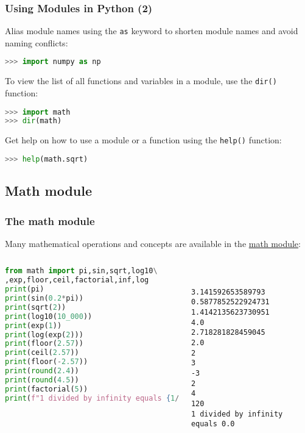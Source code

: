 \begin{frame}[fragile]
  \frametitle{Using Modules in Python (2)}
  Alias module names using the \lstinline{as} keyword to shorten module names and avoid naming conflicts:
  \begin{lstlisting}[language=Python, numbers=none]
>>> import numpy as np
  \end{lstlisting}\pause
  To view the list of all functions and variables in a module, use the \lstinline{dir()} function:
  \begin{lstlisting}[language=Python, numbers=none]
>>> import math
>>> dir(math)
  \end{lstlisting}\pause
  Get help on how to use a module or a function using the \lstinline{help()} function:
  \begin{lstlisting}[language=Python, numbers=none]
>>> help(math.sqrt)
  \end{lstlisting}
\end{frame}

\subsection{Math module}
\begin{frame}[fragile]
  \frametitle{The math module}
  Many mathematical operations and concepts are available in the \href{https://docs.python.org/3/library/math.html}{math module}:
  \begin{columns}
    \begin{lstlisting}[language=Python]
from math import pi,sin,sqrt,log10\
,exp,floor,ceil,factorial,inf,log
print(pi)
print(sin(0.2*pi))
print(sqrt(2))
print(log10(10_000))
print(exp(1))
print(log(exp(2)))
print(floor(2.57))
print(ceil(2.57))
print(floor(-2.57))
print(round(2.4))
print(round(4.5))
print(factorial(5))
print(f"1 divided by infinity equals {1/inf}")
    \end{lstlisting}\pause
    \begin{lstlisting}[style=PyOutput]
      

3.141592653589793
0.5877852522924731
1.4142135623730951
4.0
2.718281828459045
2.0
2
3
-3
2
4
120
1 divided by infinity equals 0.0
    \end{lstlisting}
  \end{columns}
\end{frame}

